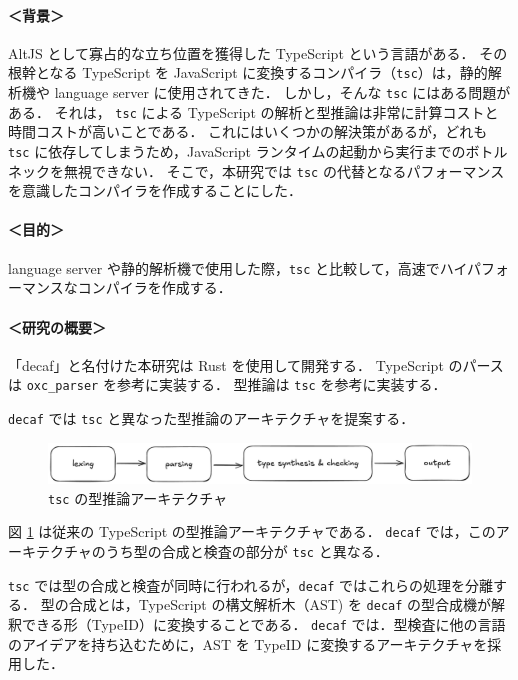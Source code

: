 \documentclass[dvipdfmx]{classes/tyukan}
\begin{document}
\paragraph{＜背景＞}
AltJS として寡占的な立ち位置を獲得した TypeScript という言語がある．
その根幹となる TypeScript を JavaScript に変換するコンパイラ（\texttt{tsc}）は，静的解析機や
language server に使用されてきた．
しかし，そんな \texttt{tsc} にはある問題がある．
それは， \texttt{tsc} による TypeScript の解析と型推論は非常に計算コストと時間コストが高いことである．
これにはいくつかの解決策があるが，どれも \texttt{tsc} に依存してしまうため，JavaScript
ランタイムの起動から実行までのボトルネックを無視できない．
そこで，本研究では \texttt{tsc} の代替となるパフォーマンスを意識したコンパイラを作成することにした．

\paragraph{＜目的＞}
language server や静的解析機で使用した際，\texttt{tsc} と比較して，高速でハイパフォーマンスなコンパイラを作成する．

\paragraph{＜研究の概要＞}
「decaf」と名付けた本研究は Rust を使用して開発する．
TypeScript のパースは \texttt{oxc\_parser} を参考に実装する．
型推論は \texttt{tsc} を参考に実装する．

\texttt{decaf} では \texttt{tsc} と異なった型推論のアーキテクチャを提案する．

\begin{figure}[h]
  \centering
  \includegraphics[width=0.9\columnwidth]{figures/type_check_arch.png}
  \caption{\texttt{tsc} の型推論アーキテクチャ}
  \label{fig:type_check_arch}
\end{figure}

図 \ref{fig:type_check_arch} は従来の TypeScript の型推論アーキテクチャである．
\texttt{decaf} では，このアーキテクチャのうち型の合成と検査の部分が \texttt{tsc} と異なる．

\texttt{tsc} では型の合成と検査が同時に行われるが，\texttt{decaf} ではこれらの処理を分離する．
型の合成とは，TypeScript の構文解析木（AST) を \texttt{decaf} の型合成機が解釈できる形（TypeID）に変換することである．
\texttt{decaf} では．型検査に他の言語のアイデアを持ち込むために，AST を TypeID に変換するアーキテクチャを採用した．
\end{document}
